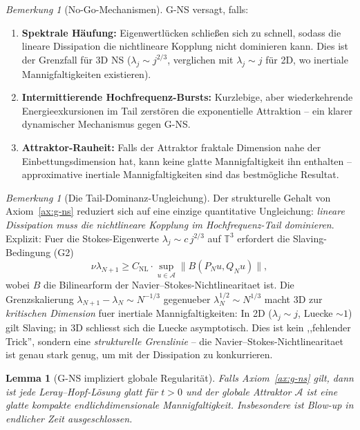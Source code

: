 \documentclass[12pt,a4paper]{article}
\theoremstyle{definition}
\theoremstyle{plain}
\newtheorem{lemma}[definition]{Lemma}
\theoremstyle{remark}
\newtheorem{remark}[definition]{Bemerkung}
\begin{document}
\begin{remark}[No-Go-Mechanismen]\label{rem:g-nogo}
G-NS versagt, falls:
\begin{enumerate}
\item \textbf{Spektrale H\"aufung:} Eigenwertl\"ucken schlie\ss en sich zu schnell, sodass die lineare Dissipation die nichtlineare Kopplung nicht dominieren kann. Dies ist der Grenzfall f\"ur 3D NS ($\lambda_j \sim j^{2/3}$, verglichen mit $\lambda_j \sim j$ f\"ur 2D, wo inertiale Mannigfaltigkeiten existieren).
\item \textbf{Intermittierende Hochfrequenz-Bursts:} Kurzlebige, aber wiederkehrende Energieexkursionen im Tail zerst\"oren die exponentielle Attraktion -- ein klarer dynamischer Mechanismus gegen G-NS.
\item \textbf{Attraktor-Rauheit:} Falls der Attraktor fraktale Dimension nahe der Einbettungsdimension hat, kann keine glatte Mannigfaltigkeit ihn enthalten -- approximative inertiale Mannigfaltigkeiten sind das bestm\"ogliche Resultat.
\end{enumerate}
\end{remark}

\begin{remark}[Die Tail-Dominanz-Ungleichung]\label{rem:tail-dominance}
Der strukturelle Gehalt von Axiom~\ref{ax:g-ns} reduziert sich auf eine einzige quantitative Ungleichung: \emph{lineare Dissipation muss die nichtlineare Kopplung im Hochfrequenz-Tail dominieren}. Explizit: Fuer die Stokes-Eigenwerte $\lambda_j \sim c\, j^{2/3}$ auf $\mathbb{T}^3$ erfordert die Slaving-Bedingung (G2)
\[
  \nu \lambda_{N+1} \geq C_{\mathrm{NL}} \cdot \sup_{u \in \mathcal{A}} \|B(P_N u, Q_N u)\|,
\]
wobei $B$ die Bilinearform der Navier--Stokes-Nichtlinearitaet ist. Die Grenzskalierung $\lambda_{N+1} - \lambda_N \sim N^{-1/3}$ gegenueber $\lambda_N^{1/2} \sim N^{1/3}$ macht 3D zur \emph{kritischen Dimension} fuer inertiale Mannigfaltigkeiten: In 2D ($\lambda_j \sim j$, Luecke $\sim 1$) gilt Slaving; in 3D schliesst sich die Luecke asymptotisch. Dies ist kein ,,fehlender Trick'', sondern eine \emph{strukturelle Grenzlinie} -- die Navier--Stokes-Nichtlinearitaet ist genau stark genug, um mit der Dissipation zu konkurrieren.
\end{remark}

\begin{lemma}[G-NS impliziert globale Regularit\"at]\label{lem:g-regularity}
Falls Axiom~\ref{ax:g-ns} gilt, dann ist jede Leray--Hopf-L\"osung glatt f\"ur $t > 0$ und der globale Attraktor $\mathcal{A}$ ist eine glatte kompakte endlichdimensionale Mannigfaltigkeit. Insbesondere ist Blow-up in endlicher Zeit ausgeschlossen.
\end{lemma}
\end{document}
